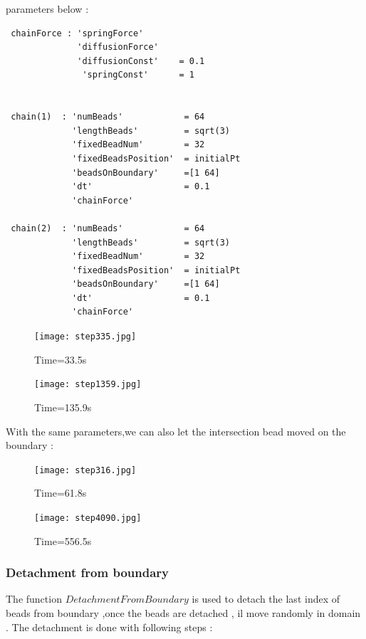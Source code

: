 \documentclass{article}
\begin{document}
parameters below :\\
 \begin{lstlisting}
 chainForce : 'springForce'
              'diffusionForce'
              'diffusionConst'    = 0.1
               'springConst'      = 1
              
              
 chain(1)  : 'numBeads'            = 64 
             'lengthBeads'         = sqrt(3)
             'fixedBeadNum'        = 32
             'fixedBeadsPosition'  = initialPt
             'beadsOnBoundary'     =[1 64]
             'dt'                  = 0.1
             'chainForce'
             
 chain(2)  : 'numBeads'            = 64 
             'lengthBeads'         = sqrt(3) 
             'fixedBeadNum'        = 32
             'fixedBeadsPosition'  = initialPt
             'beadsOnBoundary'     =[1 64]
             'dt'                  = 0.1
             'chainForce'
 \end{lstlisting}
\begin{figure}[H]
	\begin{minipage}[t]{0.55\textwidth}
		\centering
		\texttt{[image: step335.jpg]}	
		\caption{Time=33.5s}
	\end{minipage}%
	\begin{minipage}[t]{1.0\textwidth}
		\centering
		\texttt{[image: step1359.jpg]}
	    \caption{Time=135.9s}
	\end{minipage}
\end{figure}
\pagebreak
With the same parameters,we can also let the intersection bead moved 
on the boundary :\\
\begin{figure}[H]
	\begin{minipage}[t]{0.55\textwidth}
		\centering
		\texttt{[image: step316.jpg]}	
		\caption{Time=61.8s}
	\end{minipage}%
	\begin{minipage}[t]{1.0\textwidth}
		\centering
		\texttt{[image: step4090.jpg]}
		\caption{Time=556.5s}
	\end{minipage}
\end{figure}
\subsubsection{Detachment from boundary }
The function $DetachmentFromBoundary$ is used to detach the last index of beads from boundary ,once the beads are detached , il move randomly in domain .
The detachment is done with following steps :\\
\end{document}
